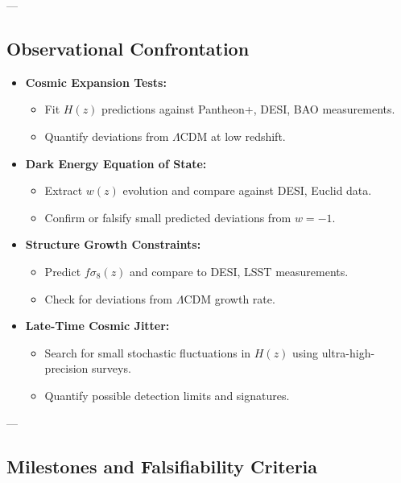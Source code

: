 \documentclass{article}
\begin{document}
---

\subsection{Observational Confrontation}

\begin{itemize}
    \item \textbf{Cosmic Expansion Tests:}
    \begin{itemize}
        \item Fit $H(z)$ predictions against Pantheon+, DESI, BAO measurements.
        \item Quantify deviations from $\Lambda$CDM at low redshift.
    \end{itemize}

    \item \textbf{Dark Energy Equation of State:}
    \begin{itemize}
        \item Extract $w(z)$ evolution and compare against DESI, Euclid data.
        \item Confirm or falsify small predicted deviations from $w = -1$.
    \end{itemize}

    \item \textbf{Structure Growth Constraints:}
    \begin{itemize}
        \item Predict $f\sigma_8(z)$ and compare to DESI, LSST measurements.
        \item Check for deviations from $\Lambda$CDM growth rate.
    \end{itemize}

    \item \textbf{Late-Time Cosmic Jitter:}
    \begin{itemize}
        \item Search for small stochastic fluctuations in $H(z)$ using ultra-high-precision surveys.
        \item Quantify possible detection limits and signatures.
    \end{itemize}
\end{itemize}

---

\subsection{Milestones and Falsifiability Criteria}
\end{document}
